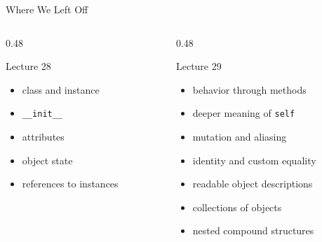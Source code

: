 \documentclass[aspectratio=169,10pt]{beamer}
\begin{document}
\begin{frame}{Where We Left Off}
  \begin{columns}[T,onlytextwidth]
    \begin{column}{0.48\textwidth}
      \begin{block}{Lecture 28}
        \begin{itemize}
          \item class and instance
          \item \texttt{\_\_init\_\_}
          \item attributes
          \item object state
          \item references to instances
        \end{itemize}
      \end{block}
    \end{column}
    \begin{column}{0.48\textwidth}
      \begin{block}{Lecture 29}
        \begin{itemize}
          \item behavior through methods
          \item deeper meaning of \texttt{self}
          \item mutation and aliasing
          \item identity and custom equality
          \item readable object descriptions
          \item collections of objects
          \item nested compound structures
        \end{itemize}
      \end{block}
    \end{column}
  \end{columns}
\end{frame}

\end{document}
